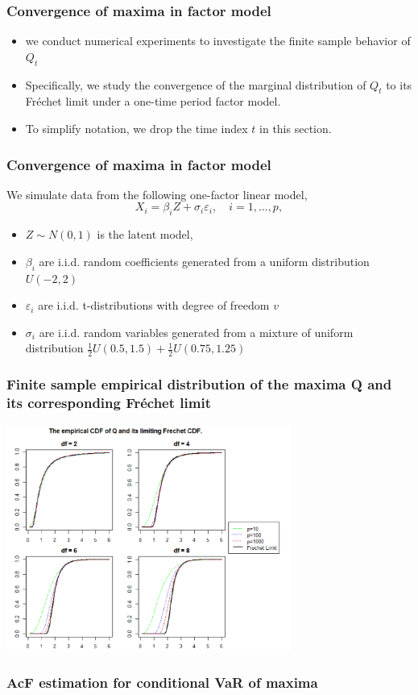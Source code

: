 \documentclass{beamer}
\begin{document}
\begin{frame}
    \frametitle{Convergence of maxima in factor model}
\begin{itemize}
    \item we conduct numerical experiments to investigate the finite sample behavior of $Q_t$
    \item Specifically, we study the convergence of the marginal distribution of $Q_t$ to its Fr\'echet limit under a one-time period factor model.
    \item To simplify notation, we drop the time index $t$ in this section.
    \end{itemize}
\end{frame}


\begin{frame}
    \frametitle{Convergence of maxima in factor model}
    We simulate data from the following one-factor
    linear model,
    $$
        X_i=\beta_iZ+\sigma_i\varepsilon_i,\quad i=1,\dots,p,
    $$
    \vspace{-2ex}
\begin{itemize}
    \item $Z\sim N(0,1)$ is the latent model,
    \item $\beta_i$ are i.i.d. random coefficients generated from a uniform distribution $U(-2,2)$
    \item $\varepsilon_i$ are i.i.d.    t-distributions with degree of freedom $v$
    \item $\sigma_i$ are i.i.d. random variables generated from a mixture of
    uniform distribution $\frac{1}{2}U(0.5,1.5)+\frac{1}{2}U(0.75,1.25)$ 
 
\end{itemize}
\end{frame}

\begin{frame}
    \frametitle{Finite sample empirical distribution of the maxima Q and its corresponding Fr\'echet limit}
    \begin{center}
        \includegraphics[width=0.7\textwidth]{fig2.png} 
    \end{center}
\end{frame}


\begin{frame}
    \frametitle{AcF estimation for conditional VaR of maxima}

    

\end{frame}
\end{document}
